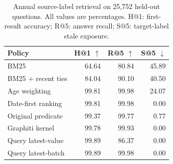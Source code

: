 \begin{table}[t]
\centering
\small
\setlength{\tabcolsep}{4pt}
\begin{tabular}{lrrr}
\toprule
Policy & H@1 $\uparrow$ & R@5 $\uparrow$ & S@5 $\downarrow$ \\
\midrule
BM25 & 64.64 & 80.84 & 45.89 \\
BM25 + recent ties & 84.04 & 90.10 & 40.50 \\
Age weighting & 99.81 & 99.98 & 24.07 \\
Date-first ranking & 99.81 & 99.98 & 0.00 \\
Original predicate & 99.37 & 99.77 & 0.77 \\
Graphiti kernel & 99.78 & 99.93 & 0.00 \\
Query latest-value & 99.89 & 86.37 & 0.00 \\
Query latest-batch & 99.89 & 99.98 & 0.00 \\
\bottomrule
\end{tabular}
\caption{Annual source-label retrieval on 25,752 held-out questions. All values are percentages. H@1: first-result accuracy; R@5: answer recall; S@5: target-label stale exposure.}
\label{tab:fullsource}
\end{table}
